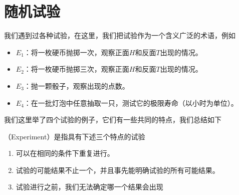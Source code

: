 \section{随机试验}
我们遇到过各种试验，在这里，我们把试验作为一个含义广泛的术语，例如
\begin{itemize}
    \item $E_1$：将一枚硬币抛掷一次，观察正面$H$和反面$T$出现的情况。
    \item $E_2$：将一枚硬币抛掷三次，观察正面$H$和反面$T$出现的情况。 
    \item $E_3$：抛一颗骰子，观察出现的点数。
    \item $E_4$：在一批灯泡中任意抽取一只，测试它的极限寿命（以小时为单位）。
\end{itemize}
我们这里举了四个试验的例子，它们有一些共同的特点，我们总结如下
\begin{BoxDefinition}[随机试验]
    （Experiment）是指具有下述三个特点的试验
    \begin{enumerate}
        \item 可以在相同的条件下重复进行。
        \item 试验的可能结果不止一个，并且事先能明确试验的所有可能结果。
        \item 试验进行之前，我们无法确定哪一个结果会出现
    \end{enumerate}
\end{BoxDefinition}
